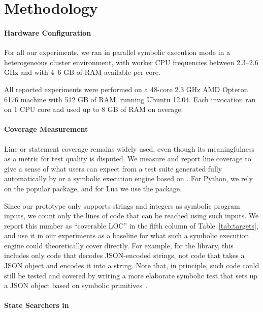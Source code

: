 
\section{Methodology}
\label{sec:eval:methodology}

\paragraph{Hardware Configuration}

For all our \cnine experiments, we ran \cnine in parallel symbolic execution mode in a heterogeneous cluster environment, with worker CPU frequencies between 2.3--2.6 GHz and with 4--6 GB of RAM available per core.

All reported \chef experiments were performed on a 48-core 2.3 GHz AMD Opteron 6176 machine with 512 GB of RAM, running Ubuntu 12.04. Each \chef invocation ran on 1 CPU core and used up to 8 GB of RAM on average.

\paragraph{Coverage Measurement}

Line or statement coverage remains widely used, even though its meaningfulness as a metric for test quality is disputed. We measure and report line coverage to give a sense of what users can expect from a test suite generated fully automatically by \cnine or a symbolic execution engine based on \chef.  For Python, we rely on the popular  package, and for Lua we use the  package.

Since our \chef prototype only supports strings and integers as symbolic program inputs, we count only the lines of code that can be reached using such inputs. We report this number as ``coverable LOC'' in the fifth column of Table~\ref{tab:targets}, and use it in our experiments as a baseline for what such a symbolic execution engine could theoretically cover directly.  For example, for the  library, this includes only code that decodes JSON-encoded strings, not code that takes a JSON object and encodes it into a string. Note that, in principle, such code could still be tested and covered by writing a more elaborate symbolic test that sets up a JSON object based on symbolic primitives~\cite{paas-testing}.

\paragraph{State Searchers in \cnine}

